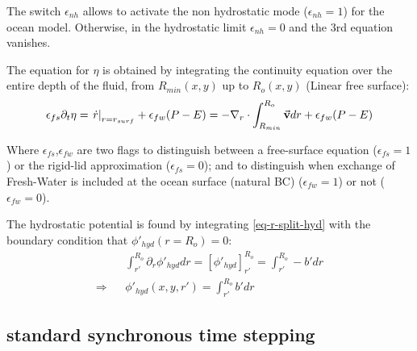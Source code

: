 The switch $\epsilon_{nh}$ allows to activate the non hydrostatic
mode ($\epsilon_{nh}=1$) for the ocean model. Otherwise, 
in the hydrostatic limit $\epsilon_{nh} = 0$ and the 3rd equation vanishes.

The equation for $\eta$ is obtained by integrating the 
continuity equation over the entire depth of the fluid, 
from $R_{min}(x,y)$ up to $R_o(x,y)$ 
(Linear free surface):
\begin{eqnarray}
\epsilon_{fs} \partial_t \eta =
\left. \dot{r} \right|_{r=r_{surf}} + \epsilon_{fw} (P-E) =
- {\bf \nabla}_r \cdot \int_{R_{min}}^{R_o} \vec{\bf v} dr
+ \epsilon_{fw} (P-E)
\label{eq-cont-2D}
\end{eqnarray}

Where $\epsilon_{fs}$,$\epsilon_{fw}$ are two flags to 
distinguish between a free-surface equation ($\epsilon_{fs}=1$) 
or the rigid-lid approximation ($\epsilon_{fs}=0$);  
and to distinguish when exchange of Fresh-Water is included 
at the ocean surface (natural BC) ($\epsilon_{fw} = 1$) 
or not ($\epsilon_{fw} = 0$).

The hydrostatic potential is found by
integrating \ref{eq-r-split-hyd} with the boundary condition that
$\phi'_{hyd}(r=R_o) = 0$:
\begin{eqnarray*}
& &
\int_{r'}^{R_o} \partial_r \phi'_{hyd} dr =
\left[ \phi'_{hyd} \right]_{r'}^{R_o} =
\int_{r'}^{R_o} - b' dr
\\
\Rightarrow & &
\phi'_{hyd}(x,y,r') = \int_{r'}^{R_o} b' dr
\end{eqnarray*}

\subsection{standard synchronous time stepping}

